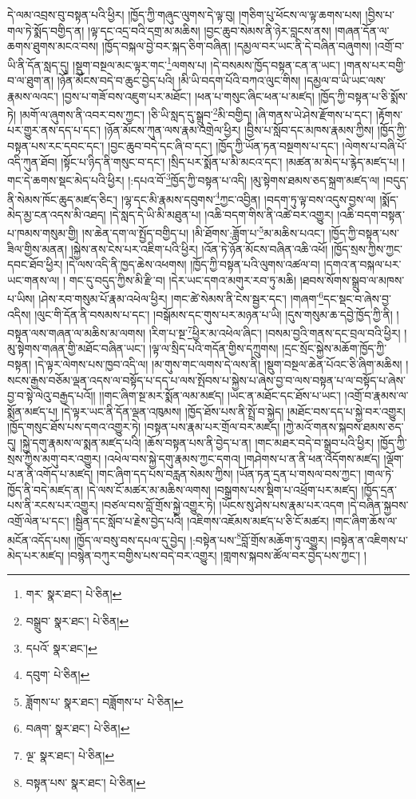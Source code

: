 དེ་ལམ་འབྲས་བུ་བསྟན་པའི་ཕྱིར། །ཁྱོད་ཀྱི་གཞུང་ལུགས་དེ་ལྟ་བུ། །གཅིག་པུ་ཕོངས་ལ་ལྟ་ཆགས་པས། །བྱིས་པ་གལ་ཏེ་སྨོད་བགྱིད་ན། །ལྟ་དང་འདྲ་བའི་དགྲ་མ་མཆིས། །བྱང་ཆུབ་སེམས་ནི་ཉེར་བླངས་ནས། །གཞན་དོན་ལ་ཆགས་ཐུགས་མངའ་བས། །ཁྱོད་བསྐལ་བྱེ་བར་སྐད་ཅིག་བཞིན། །དམྱལ་བར་ཡང་ནི་དེ་བཞིན་བཞུགས། །འགྲོ་བ་ཡི་ནི་དོན་སླད་དུ། །སྡུག་བསྔལ་མང་ལྟར་གང་\footnote{གར་  སྣར་ཐང་།  པེ་ཅིན། }ལགས་པ། །དེ་བསམས་ཁྱོད་བསྟན་ངན་ན་ཡང་། །གནས་པར་བགྱི་བ་ལ་ཐུག་ན། །ཉོན་མོངས་བདེ་བ་ཆུང་བྱེད་པའི། །མི་ཡི་བདག་པོའི་བཀའ་ལུང་གིས། །དམྱལ་བ་ཡི་ཡང་ལས་རྣམས་ལའང་། །བྱས་པ་གཟོ་བས་འཇུག་པར་མཐོང་། །ཕན་པ་གསུང་ཞིང་ཕན་པ་མཛད། །ཁྱོད་ཀྱི་བསྟན་པ་ཅི་སྨོས་ཏེ། །མགོ་ལ་ཞུགས་ནི་འབར་བས་ཀྱང་། །ཅི་ཡི་སླད་དུ་སྒྲུབ་\footnote{བསྒྲུབ་  སྣར་ཐང་།  པེ་ཅིན། }མི་བགྱིད། །ཞི་གནས་ཡེ་ཤེས་རྫོགས་པ་དང་། །རྟོགས་པར་གྱུར་ནས་དད་པ་དང་། །ཉོན་མོངས་ཀུན་ལས་རྣམ་འགྲེལ་ཕྱིར། །བྱིས་པ་སློབ་དང་མཁས་རྣམས་ཀྱིས། །ཁྱོད་ཀྱི་བསྟན་པས་རང་དབང་དང་། །བྱང་ཆུབ་བདེ་དང་ཞི་བ་དང་། །ཁྱོད་ཀྱི་ཡོན་ཏན་བསྔགས་པ་དང་། །ལེགས་པ་བཞི་པོ་འདི་ཀུན་ཐོབ། །སྟོང་པ་ཉིད་ནི་གསུང་བ་དང་། །སྲིད་པར་སྨོན་པ་མི་མངའ་དང་། །མཚན་མ་མེད་པ་རྙེད་མཛད་པ། །གང་དེ་ཆགས་སྡང་མེད་པའི་ཕྱིར། །:དཔའ་བོ་\footnote{དཔའོ་  སྣར་ཐང་། }ཁྱོད་ཀྱི་བསྟན་པ་འདི། །མུ་སྟེགས་ཐམས་ཅད་སྐྲག་མཛད་ལ། །བདུད་ནི་སེམས་ཁོང་ཆུད་མཛད་ཅིང་། །ལྷ་དང་མི་རྣམས་དབུགས་\footnote{དབུག་  པེ་ཅིན། }ཀྱང་འབྱིན། །བདག་ཏུ་ལྟ་བས་འདུས་བྱས་ལ། །སྨོད་མེད་མྱ་ངན་འདས་མི་འཐད། །དེ་སླད་དེ་ཡི་མི་མཐུན་པ། །འཆི་བདག་གིས་ནི་འཚེ་བར་འགྱུར། །འཆི་བདག་བསྟན་པ་ཁམས་གསུམ་གྱི། །ས་ཆེན་དག་ལ་སྤྱོད་བགྱིད་པ། །མི་ཐོགས་:ཟློག་པ་\footnote{ཟློགས་པ་  སྣར་ཐང་། བཟློགས་པ་  པེ་ཅིན། }མ་མཆིས་པའང་། །ཁྱོད་ཀྱི་བསྟན་པས་ཟིལ་གྱིས་མནན། །སྐྱེས་ནས་ངེས་པར་འཇིག་པའི་ཕྱིར། །འོན་ཏེ་ཉོན་མོངས་བཞིན་འཆི་འཕོ། །ཁྱོད་སྲས་ཀྱིས་ཀྱང་དབང་ཐོབ་ཕྱིར། །དེ་ལས་འདི་ནི་ཁྱད་ཆེས་འཕགས། །ཁྱོད་ཀྱི་བསྟན་པའི་ལུགས་འཚལ་བ། །དགའ་ན་བསྐལ་པར་ཡང་གནས་ལ། །
གང་དུ་བདུད་ཀྱིས་མི་རྫི་བ། །དེར་ཡང་དགའ་མགུར་རབ་ཏུ་མཆི། །ཐབས་སོགས་སྒྲུབ་ལ་མཁས་པ་ཡིས། །ཤེས་རབ་གསུམ་པོ་རྣམ་འཕེལ་ཕྱིར། །གང་ཚེ་སེམས་ནི་ངེས་སྦྱར་དང་། །གཞག་\footnote{བཞག་  སྣར་ཐང་།  པེ་ཅིན། }དང་སྡང་བ་ཞེས་བྱ་འདིས། །ལུང་གི་དོན་ནི་བསམས་པ་དང་། །བསྒོམས་དང་གུས་པར་མཉན་པ་ཡི། །དུས་གསུམ་ཆ་དབྱེ་ཁྱོད་ཀྱི་ནི། །བསྟན་ལས་གཞན་ལ་མཆིས་མ་ལགས། །རིག་པ་སྔ་\footnote{ལྔ་  སྣར་ཐང་།  པེ་ཅིན། }ཕྱིར་མ་འཕེལ་ཞིང་། །བསམ་བྱའི་གནས་དང་བྲལ་བའི་ཕྱིར། །མུ་སྟེགས་གཞན་གྱི་མཐོང་བཞིན་ཡང་། །ལྟ་ལ་སྲིད་པའི་གདོན་གྱིས་དཀྲུགས། །དྲང་སྲོང་སྐྱེས་མཆོག་ཁྱོད་ཀྱི་བསྟན། །དེ་ལྟར་ལེགས་པས་ཁྱབ་འདི་ལ། །མ་གུས་གང་ལགས་དེ་ལས་ནི། །སྡུག་བསྔལ་ཆེན་པོའང་ཅི་ཞིག་མཆིས། །སངས་རྒྱས་བཅོམ་ལྡན་འདས་ལ་བསྟོད་པ་དད་པ་ལས་སྤོབས་པ་སྐྱེས་པ་ཞེས་བྱ་བ་ལས་བསྟན་པ་ལ་བསྟོད་པ་ཞེས་བྱ་བ་སྟེ་ལེའུ་བརྒྱད་པའོ།། །།གང་ཞིག་སྔ་མར་སྨོན་ལམ་མཛད། །ཡང་ན་མཐོང་དང་ཐོས་པ་ཡང་། །འགྲོ་བ་རྣམས་ལ་སྨོན་མཛད་པ། །དེ་ལྟར་ཡང་ནི་དོན་ལྡན་འཁུམས། །ཁྱོད་ཐོས་པས་ནི་སྤྲོ་བ་སྐྱེད། །མཐོང་བས་དད་པ་སྐྱེ་བར་འགྱུར། །ཁྱོད་གསུང་ཐོས་པས་དགའ་འགྱུར་ཏེ། །བསྟན་པས་རྣམ་པར་གྲོལ་བར་མཛད། །ཀྱེ་མའོ་གནས་སྐབས་ཐམས་ཅད་དུ། །སྐྱེ་དགུ་རྣམས་ལ་སྨན་མཛད་པའི། །ཆོས་བསྟན་པས་ནི་བྱེད་པ་ན། །གང་མཐར་བདེ་བ་སྒྲུབ་པའི་ཕྱིར། །ཁྱོད་ཀྱི་སྲས་ཀྱིས་མགུ་བར་འགྱུར། །འཕེལ་བས་སྐྱེ་དགུ་རྣམས་ཀྱང་དགའ། །གཤེགས་པ་ན་ནི་ཕན་འདོགས་མཛད། །ལྡོག་པ་ན་ནི་འགོད་པ་མཛད། །གང་ཞིག་དད་པས་བརླན་སེམས་ཀྱིས། །ཡོན་ཏན་དྲན་པ་གསལ་བས་ཀྱང་། །གལ་ཏེ་ཁྱོད་ནི་བདེ་མཛད་ན། །དེ་ལས་ངོ་མཚར་མ་མཆིས་ལགས། །བསྒྲགས་པས་སྡིག་པ་འཕྲོག་པར་མཛད། །ཁྱོད་དྲན་པས་ནི་རངས་པར་འགྱུར། །བཙལ་བས་བློ་གྲོས་སྐྱེ་འགྱུར་ཏེ། །ཡོངས་སུ་ཤེས་པས་རྣམ་པར་འདག །དེ་བཞིན་སྐྱབས་འགྲོ་ལེན་པ་དང་། །སྦྱིན་དང་སློབ་པ་རྗེས་བྱེད་པའི། །འཇིགས་འཇོམས་མཛད་པ་ཅི་ངོ་མཚར། །གང་ཞིག་ཆོས་ལ་མངོན་འདོད་པས། །ཁྱོད་ལ་བསུ་བས་དཔལ་དུ་བྱེད། །:བསྟེན་པས་\footnote{བསྟན་པས་  སྣར་ཐང་།  པེ་ཅིན། }བློ་གྲོས་མཆོག་ཏུ་འགྱུར། །བསྟེན་ན་འཇིགས་པ་མེད་པར་མཛད། །བསྙེན་བཀུར་བགྱིས་པས་བདེ་བར་འགྱུར། །གླགས་སྐབས་ཚོལ་བར་བྱེད་པས་ཀྱང་། །
